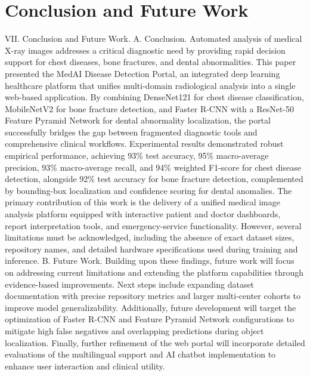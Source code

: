 \documentclass[conference]{IEEEtran}
\begin{document}
\section{Conclusion and Future Work}

VII. Conclusion and Future Work. A. Conclusion. Automated analysis of medical X-ray images addresses a critical diagnostic need by providing rapid decision support for chest diseases, bone fractures, and dental abnormalities. This paper presented the MedAI Disease Detection Portal, an integrated deep learning healthcare platform that unifies multi-domain radiological analysis into a single web-based application. By combining DenseNet121 for chest disease classification, MobileNetV2 for bone fracture detection, and Faster R-CNN with a ResNet-50 Feature Pyramid Network for dental abnormality localization, the portal successfully bridges the gap between fragmented diagnostic tools and comprehensive clinical workflows. Experimental results demonstrated robust empirical performance, achieving 93\% test accuracy, 95\% macro-average precision, 93\% macro-average recall, and 94\% weighted F1-score for chest disease detection, alongside 92\% test accuracy for bone fracture detection, complemented by bounding-box localization and confidence scoring for dental anomalies. The primary contribution of this work is the delivery of a unified medical image analysis platform equipped with interactive patient and doctor dashboards, report interpretation tools, and emergency-service functionality. However, several limitations must be acknowledged, including the absence of exact dataset sizes, repository names, and detailed hardware specifications used during training and inference. B. Future Work. Building upon these findings, future work will focus on addressing current limitations and extending the platform capabilities through evidence-based improvements. Next steps include expanding dataset documentation with precise repository metrics and larger multi-center cohorts to improve model generalizability. Additionally, future development will target the optimization of Faster R-CNN and Feature Pyramid Network configurations to mitigate high false negatives and overlapping predictions during object localization. Finally, further refinement of the web portal will incorporate detailed evaluations of the multilingual support and AI chatbot implementation to enhance user interaction and clinical utility.
\end{document}
